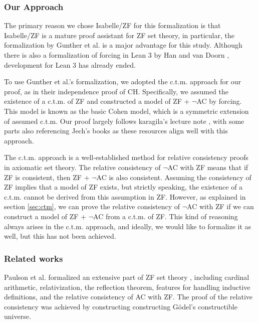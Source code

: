 \documentclass{report}
\begin{document}
\subsubsection{Our Approach}
The primary reason we chose Isabelle/ZF for this formalization is that Isabelle/ZF is a mature proof assistant for ZF set theory,
in particular, the formalization by Gunther et al. \cite{gunther_forcing} is a major advantage for this study.
Although there is also a formalization of forcing in Lean 3 by Han and van Doorn \cite{flypitch}, development for Lean 3 has already ended.

To use Gunther et al.'s formalization, we adopted the c.t.m. approach for our proof, as in their independence proof of CH.
Specifically, we assumed the existence of a c.t.m. of ZF and constructed a model of ZF + $\neg$AC by forcing.
This model is known as the basic Cohen model, which is a symmetric extension of assumed c.t.m.
Our proof largely follows karagila's lecture note \cite{karagila}, with some parts also referencing Jech's books \cite{jech_set_theory,jech_AC}
as these resources align well with this approach.

The c.t.m. approach is a well-established method for relative consistency proofs in axiomatic set theory.
The relative consistency of $\neg$AC with ZF means that if ZF is consistent, then ZF + $\neg$AC is also consistent.
Assuming the consistency of ZF implies that a model of ZF exists, but strictly speaking, the existence of a c.t.m. cannot be derived from this assumption in ZF.
However, as explained in section \ref{sec:ctm}, we can prove the relative consistency of $\neg$AC with ZF if 
we can construct a model of ZF + $\neg$AC from a c.t.m. of ZF.
This kind of reasoning always arises in the c.t.m. approach, and ideally, 
we would like to formalize it as well, but this has not been achieved.




\subsubsection{Related works}
Paulson et al. formalized an extensive part of ZF set theory 
\cite{paulson_datatype_impl,paulson_reflection,paulson_AC_consistency,paulson_cardinal_AC,paulson_datatype}
, including cardinal arithmetic, relativization, the reflection theorem, features for handling inductive definitions, and the relative consistency of AC with ZF.
The proof of the relative consistency was achieved by constructing constructing Gödel's constructible universe.
\end{document}
